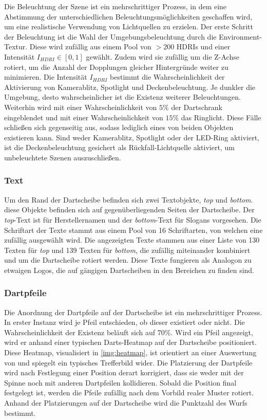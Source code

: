 Die Beleuchtung der Szene ist ein mehrschrittiger Prozess, in dem eine Abstimmung der unterschiedlichen Beleuchtungsmöglichkeiten geschaffen wird, um eine realistische Verwendung von Lichtquellen zu erzielen. Der erste Schritt der Beleuchtung ist die Wahl der Umgebungsbeleuchtung durch die Environment-Textur. Diese wird zufällig aus einem Pool von $>200$ HDRIs und einer Intensität $I_{HDRI} \in [0, 1]$ gewählt. Zudem wird sie zufällig um die Z-Achse rotiert, um die Anzahl der Dopplungen gleicher Hintergründe weiter zu minimieren. Die Intensität $I_{HDRI}$ bestimmt die Wahrscheinlichkeit der Aktivierung von Kamerablitz, Spotlight und Deckenbeleuchtung. Je dunkler die Umgebung, desto wahrscheinlicher ist die Existenz weiterer Beleuchtungen.
Weiterhin wird mit einer Wahrscheinlichkeit von $5\%$ der Dartschrank eingeblendet und mit einer Wahrscheinlichkeit von $15\%$ das Ringlicht. Diese Fälle schließen sich gegenseitig aus, sodass lediglich eines von beiden Objekten existieren kann.
Sind weder Kamerablitz, Spotlight oder der LED-Ring aktiviert, ist die Deckenbeleuchtung gesichert als Rückfall-Lichtquelle aktiviert, um unbeleuchtete Szenen auszuschließen.

\subsubsection{Text}
\label{sec:impl:daten:python:text}

Um den Rand der Dartscheibe befinden sich zwei Textobjekte, \textit{top} und \textit{bottom}. diese Objekte befinden sich auf gegenüberliegenden Seiten der Dartscheibe. Der \textit{top}-Text ist für Herstellernamen und der \textit{bottom}-Text für Slogans vorgesehen. Die Schriftart der Texte stammt aus einem Pool von 16 Schriftarten, von welchen eine zufällig ausgewählt wird. Die angezeigten Texte stammen aus einer Liste von 130 Texten für \textit{top} und 139 Texten für \textit{bottom}, die zufällig miteinander kombiniert und um die Dartscheibe rotiert werden. Diese Texte fungieren als Analogon zu etwaigen Logos, die auf gängigen Dartscheiben in den Bereichen zu finden sind.

\subsubsection{Dartpfeile}
\label{sec:impl:daten:python:pfeile}

Die Anordnung der Dartpfeile auf der Dartscheibe ist ein mehrschrittiger Prozess. In erster Instanz wird je Pfeil entschieden, ob dieser existiert oder nicht. Die Wahrscheinlichkeit der Existenz beläuft sich auf 70\%. Wird ein Pfeil angezeigt, wird er anhand einer typischen Darts-Heatmap auf der Dartscheibe positioniert. Diese Heatmap, visualisiert in \autoref{img:heatmap}, ist orientiert an einer Auswertung von \cite{heatmap} und spiegelt ein typisches Trefferbild wider. Die Platzierung der Dartpfeile wird nach Festlegung einer Position derart korrigiert, dass sie weder mit der Spinne noch mit anderen Dartpfeilen kollidieren. Sobald die Position final festgelegt ist, werden die Pfeile zufällig nach dem Vorbild realer Muster rotiert. Anhand der Platzierungen auf der Dartscheibe wird die Punktzahl des Wurfs bestimmt.

